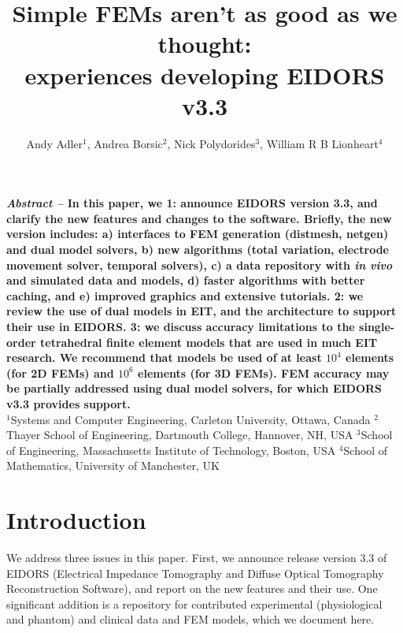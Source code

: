 \documentclass[letterpaper,twocolumn,10pt]{article}
\begin{document}
\title{\bf 
Simple FEMs aren't as good as we thought: \\
  experiences developing EIDORS v3.3%
}

\author{Andy Adler$^{1}$,
        Andrea Borsic$^{2}$,
        Nick Polydorides$^{3}$,
        William R B Lionheart$^{4}$}
\date{}
\maketitle

\renewcommand{\baselinestretch}{0.9} \normalfont
{\small \bf %
{\em Abstract --}
In this paper, we 1: announce
EIDORS version 3.3, and clarify the new features and
changes to the software.
Briefly, the new version includes:
a) interfaces to FEM generation (distmesh, netgen) and 
  dual model solvers,
b) new algorithms (total variation, electrode movement solver,
  temporal solvers),
c) a data repository with {\em in vivo} and simulated 
   data and models,
d) faster algorithms with better caching, and
e) improved graphics and extensive tutorials.
2: we review the use of dual models in EIT, and the
architecture to support their use in EIDORS.
3: we discuss accuracy limitations to the single-order
tetrahedral finite element models that are used
in much EIT research. We recommend that
models be used of at least $10^4$ elements (for 2D FEMs)
and $10^6$ elements (for 3D FEMs).
FEM accuracy may be partially addressed using
dual model solvers, for which EIDORS v3.3
provides support.
}
~\\

{\small
\noindent
$^1$Systems and Computer Engineering, Carleton University, Ottawa, Canada
$^2$Thayer School of Engineering, Dartmouth College, Hannover, NH, USA
$^3$School of Engineering, Massachusetts Institute of Technology, Boston, USA
$^4$School of Mathematics, University of Manchester, UK
}
\renewcommand{\baselinestretch}{1.0} \normalfont


\section{Introduction}

We address three issues in this paper.
First, we announce
release version 3.3 of EIDORS (Electrical Impedance Tomography and
 Diffuse Optical Tomography Reconstruction Software),
and report on the new features and their use. One significant
addition is a repository for contributed experimental 
(physiological and phantom) and
clinical data and FEM models, which we document here.
\end{document}
